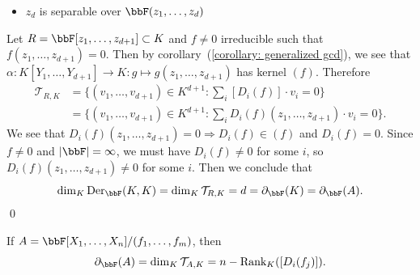 \begin{itemize}
\begin{itemize}
    \item $z_d$ is separable over $\bbF(z_1,\dots, z_d)$
  \end{itemize}
  Let $R = \bbF[z_1,\dots, z_{d+1}]\subset K$ and $f\neq0$ irreducible such that 
  $f(z_1,\dots, z_{d+1})=0$. Then by corollary~(\ref{corollary: generalized gcd}), we see that 
  $\alpha:K[Y_1,\dots,Y_{d+1}]\to K:g\mapsto g(z_1,\dots, z_{d+1})$ has kernel $(f)$. 
  Therefore 
  \begin{equation}
    \begin{split}
        \mathcal{T}_{R,K} &= \{(v_1,\dots,v_{d+1})\in K^{d+1}:\sum_i[D_i(f)]\cdot v_i=0\}\\
        &=\{(v_1,\dots,v_{d+1})\in K^{d+1}: \sum_i D_i(f)(z_1,\dots, z_{d+1})\cdot v_i=0\}.
    \end{split}
  \end{equation}
  We see that $D_i(f)(z_1,\dots,z_{d+1})=0\Rightarrow D_i(f)\in (f)$ and $D_i(f)=0$. Since 
  $f\neq0$ and $|\bbF|=\infty$, we must have $D_i(f)\neq0$ for some $i$, so $D_i(f)(z_1,\dots, z_{d+1})\neq0$
  for some $i$. Then we conclude that 
  \begin{equation}
   \dim_K\text{Der}_{\bbF}(K,K)= \dim_{K} \mathcal{T}_{R,K} = d = \partial_{\bbF}(K) = \partial_{\bbF}(A).
  \end{equation}
  \qed
  \begin{corollary}
    If $A=\bbF[X_1,\dots,X_n]/(f_1,\dots,f_m)$, then  
    \begin{equation}
        \partial_{\bbF}(A) = \dim_K\mathcal{T}_{A,K}=n-\text{Rank}_K([D_i(f_j)]).
    \end{equation}
  \end{corollary} 


\end{itemize}
